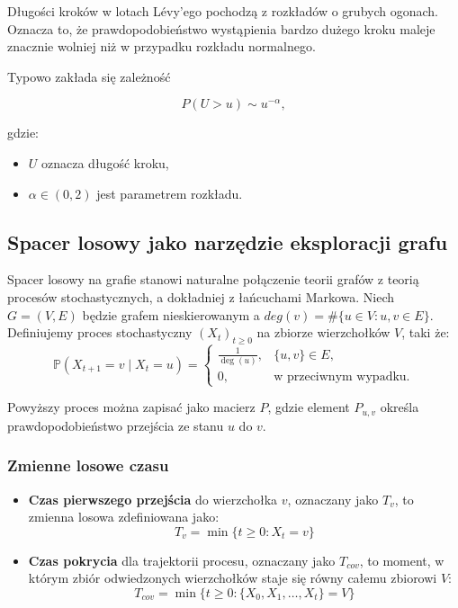 Długości kroków w lotach Lévy'ego pochodzą z rozkładów o grubych ogonach. Oznacza to, że prawdopodobieństwo wystąpienia bardzo dużego kroku maleje znacznie wolniej niż w przypadku rozkładu normalnego.

Typowo zakłada się zależność

\[
P(U>u)\sim u^{-\alpha},
\]

gdzie:

\begin{itemize}
\item $U$ oznacza długość kroku,
\item $\alpha \in (0, 2)$ jest parametrem rozkładu.
\end{itemize}

\subsection{Spacer losowy jako narzędzie eksploracji grafu}

Spacer losowy na grafie stanowi naturalne połączenie teorii grafów z teorią procesów stochastycznych, a dokładniej z łańcuchami Markowa.
Niech $G=(V,E)$ będzie grafem nieskierowanym a $deg(v)=\# \{u \in V:{u,v} \in E\}$. Definiujemy proces stochastyczny $(X_t)_{t\geq 0}$ na zbiorze wierzchołków $V$, taki że:
\[
\mathbb{P}(X_{t+1}=v \mid X_t=u)=
\begin{cases}
\frac{1}{\deg(u)}, & \{u,v\}\in E,\\[6pt]
0, & \text{w przeciwnym wypadku}.
\end{cases}
\]

Powyższy proces można zapisać jako macierz $P$, gdzie  element $P_{u,v}$ określa prawdopodobieństwo przejścia ze stanu $u$ do $v$. 

\subsubsection{Zmienne losowe czasu}
\begin{itemize}
    \item \textbf{Czas pierwszego przejścia} do wierzchołka $v$, oznaczany jako $T_v$, to zmienna losowa zdefiniowana jako:
    $$ T_v = \min\{t \geq 0 : X_t = v\} $$
    \item \textbf{Czas pokrycia } dla trajektorii procesu, oznaczany jako $T_{cov}$, to moment, w którym zbiór odwiedzonych wierzchołków staje się równy całemu zbiorowi $V$:
    $$ T_{cov} = \min\{t \geq 0 : \{X_0, X_1, \dots, X_t\} = V\} $$
\end{itemize}

